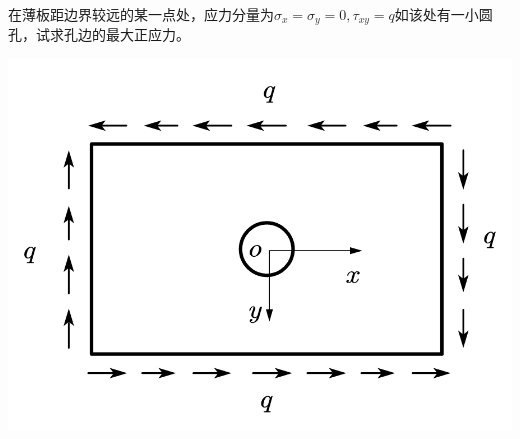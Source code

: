 \begin{example}
	在薄板距边界较远的某一点处，应力分量为$\sigma _x=\sigma _y=0,\tau _{xy}=q$如该处有一小圆孔，试求孔边的最大正应力。
\end{example}
\centerline{\includegraphics[scale=0.45]{figure/4-12.png}}
